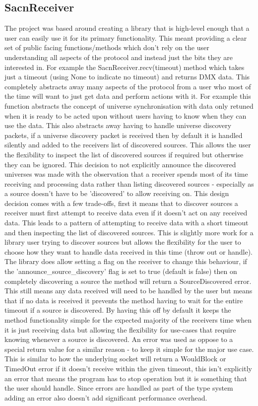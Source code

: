 \documentclass[11pt,a4paper]{report}
\begin{document}
\subsection{SacnReceiver}
The project was based around creating a library that is high-level enough that a user can easily use it for its primary functionality. This meant providing a clear set of public facing functions/methods which don't rely on the user understanding all aspects of the protocol and instead just the bits they are interested in. For example the SacnReceiver.recv(timeout) method which takes just a timeout (using None to indicate no timeout) and returns DMX data. This completely abstracts away many aspects of the protocol from a user who most of the time will want to just get data and perform actions with it. For example this function abstracts the concept of universe synchronisation with data only retuned when it is ready to be acted upon without users having to know when they can use the data. This also abstracts away having to handle universe discovery packets, if a universe discovery packet is received then by default it is handled silently and added to the receivers list of discovered sources. This allows the user the flexibility to inspect the list of discovered sources if required but otherwise they can be ignored. This decision to not explicitly announce the discovered universes was made with the observation that a receiver spends most of its time receiving and processing data rather than listing discovered sources - especially as a source doesn't have to be 'discovered' to allow receiving on. This design decision comes with a few trade-offs, first it means that to discover sources a receiver must first attempt to receive data even if it doesn't act on any received data. This leads to a pattern of attempting to receive data with a short timeout and then inspecting the list of discovered sources. This is slightly more work for a library user trying to discover sources but allows the flexibility for the user to choose how they want to handle data received in this time (throw out or handle). The library does allow setting a flag on the receiver to change this behaviour, if the 'announce\_source\_discovery' flag is set to true (default is false) then on completely discovering a source the method will return a SourceDiscovered error. This still means any data received will need to be handled by the user but means that if no data is received it prevents the method having to wait for the entire timeout if a source is discovered. By having this off by default it keeps the method functionality simple for the expected majority of the receivers time when it is just receiving data but allowing the flexibility for use-cases that require knowing whenever a source is discovered. An error was used as oppose to a special return value for a similar reason - to keep it simple for the major use case. This is similar to how the underlying socket will return a WouldBlock or TimedOut error if it doesn't receive within the given timeout, this isn't explicitly an error that means the program has to stop operation but it is something that the user should handle. Since errors are handled as part of the type system adding an error also doesn't add significant performance overhead. \\
	 
\end{document}
